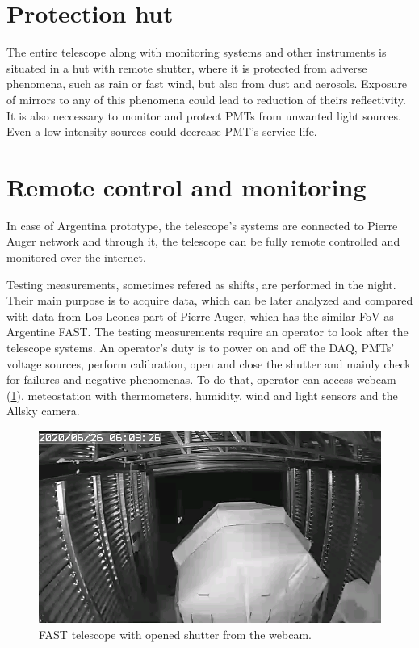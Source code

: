 \section{Protection hut}
The entire telescope along with monitoring systems and other instruments is situated in a hut with remote shutter, where it is protected from adverse phenomena, such as rain or fast wind, but also from dust and aerosols. Exposure of mirrors to any of this phenomena could lead to reduction of theirs reflectivity. It is also neccessary to monitor and protect PMTs from unwanted light sources. Even a low-intensity sources could decrease PMT's service life.

\section{Remote control and monitoring}
In case of Argentina prototype, the telescope's systems are connected to Pierre Auger network and through it, the telescope can be fully remote controlled and monitored over the internet. 

\par
Testing measurements, sometimes refered as shifts, are performed in the night. Their main purpose is to acquire data, which can be later analyzed and compared with data from Los Leones part of Pierre Auger, which has the similar FoV as Argentine FAST. 
The testing measurements require an operator to look after the telescope systems. An operator's duty is to power on and off the DAQ, PMTs' voltage sources, perform calibration, open and close the shutter and mainly check for failures and negative phenomenas. To do that, operator can access webcam (\ref{FASTCam}), meteostation with thermometers, humidity, wind and light sensors and the Allsky camera.

\begin{figure}[H]
 \centering
 \includegraphics[scale = 0.5]{./pictures/operatinFast}
 \caption{FAST telescope with opened shutter from the webcam.}
 \label{FASTCam}
 
\end{figure}

